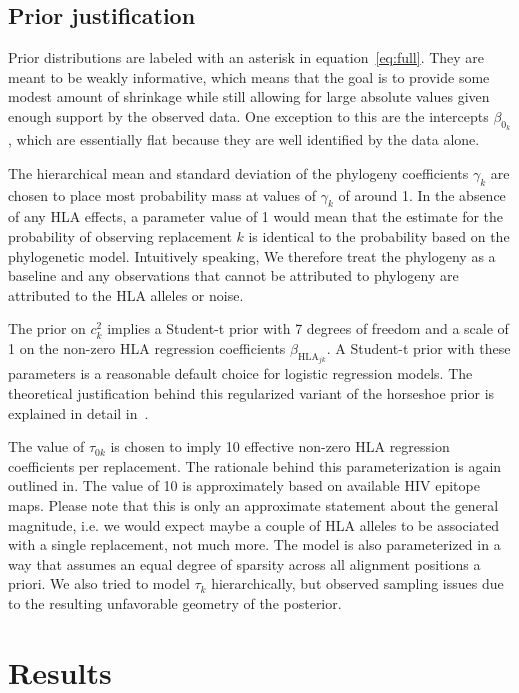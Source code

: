 \documentclass[fleqn,11pt]{SelfArx} %
\begin{document}
\subsection*{Prior justification}

Prior distributions are labeled with an asterisk in equation~\ref{eq:full}. They are meant to be weakly informative, which means that the goal is to provide some modest amount of shrinkage while still allowing for large absolute values given enough support by the observed data. One exception to this are the intercepts \(\beta_{0_k}\), which are essentially flat because they are well identified by the data alone.

The hierarchical mean and standard deviation of the phylogeny coefficients \(\gamma_{k}\) are chosen to place most probability mass at values of \(\gamma_{k}\) of around 1. In the absence of any HLA effects, a parameter value of 1 would mean that the estimate for the probability of observing replacement \(k\) is identical to the probability based on the phylogenetic model. Intuitively speaking, We therefore treat the phylogeny as a baseline and any observations that cannot be attributed to phylogeny are attributed to the HLA alleles or noise.

The prior on \(c_{k}^{2}\) implies a Student-t prior with 7 degrees of freedom and a scale of 1 on the non-zero HLA regression coefficients \(\beta_{\text{HLA}_{jk}}\). A Student-t prior with these parameters is a reasonable default choice for logistic regression models. The theoretical justification behind this regularized variant of the horseshoe prior is explained in detail in~\cite{Piironen2017}.

The value of \(\tau_{0k}\) is chosen to imply 10 effective non-zero HLA regression coefficients per replacement. The rationale behind this parameterization is again outlined in\cite{Piironen2017}. The value of 10 is approximately based on available HIV epitope maps. Please note that this is only an approximate statement about the general magnitude, i.e. we would expect maybe a couple of HLA alleles to be associated with a single replacement, not much more.
The model is also parameterized in a way that assumes an equal degree of sparsity across all alignment positions a priori. We also tried to model \(\tau_k\) hierarchically, but observed sampling issues due to the resulting unfavorable geometry of the posterior.

\section{Results} \label{sec:results}
\end{document}
